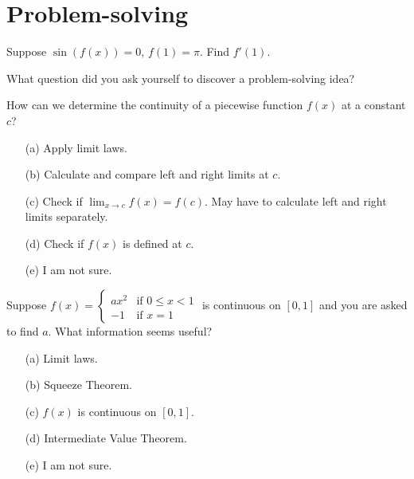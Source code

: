 \documentclass[14pt]{beamer}
\begin{document}
\section{Problem-solving}
\begin{frame}[t]
  Suppose \(\sin(f(x)) = 0\), \(f(1) = \pi\). Find \(f'(1)\).

  What question did you ask yourself to discover a problem-solving idea?
\end{frame}

\begin{frame}[t]
  How can we determine the continuity of a piecewise function \(f(x)\) at a constant \(c\)?

  \medskip
  \begin{itemize} \setlength\itemsep{2ex}
    \item[(a)] Apply limit laws.
    \item[(b)] Calculate and compare left and right limits at \(c\).
    \item[(c)] Check if \(\lim_{x \to c}f(x) = f(c)\). May have to calculate left and right limits separately.
    \item[(d)] Check if \(f(x)\) is defined at \(c\).
    \item[(e)] I am not sure.
  \end{itemize} 
\end{frame}

\begin{frame}[t]
  Suppose \(f(x) = \begin{cases} ax^{2} &\text{if } 0 \le x < 1 \\ -1 &\text{if } x = 1 \end{cases}\) is continuous on \([0,1]\) and you are asked to find \(a\). What information seems useful?

  \medskip
  \begin{itemize} \setlength\itemsep{2ex}
    \item[(a)] Limit laws.
    \item[(b)] Squeeze Theorem.
    \item[(c)] \(f(x)\) is continuous on \([0,1]\).
    \item[(d)] Intermediate Value Theorem.
    \item[(e)] I am not sure.
  \end{itemize} 
\end{frame}
\end{document}
